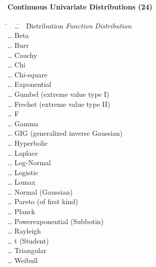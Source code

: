 \paragraph{Continuous Univariate Distributions (24)}

\begin{tabbing}
	\hspace*{1em}
	\= ~~\=\ldots~~\=  Distribution \kill
	\> \emph{Function} \> \> \emph{Distribution} \\[1ex]
	\> 	\> \ldots \> Beta \\
	\> 	\> \ldots \> Burr \\
	\> 	\> \ldots \> Cauchy \\
	\> 	\> \ldots \> Chi \\
	\> 	\> \ldots \> Chi-square \\
	\> 	\> \ldots \> Exponential \\
	\> 	\> \ldots \> Gumbel (extreme value type I) \\
	\> 	\> \ldots \> Frechet (extreme value type II) \\
	\> 	\> \ldots \> F \\
	\> 	\> \ldots \> Gamma \\
	\> 	\> \ldots \> GIG (generalized inverse Gaussian) \\
	\> 	\> \ldots \> Hyperbolic \\
	\> 	\> \ldots \> Laplace \\
	\> 	\> \ldots \> Log-Normal \\
	\> 	\> \ldots \> Logistic \\
	\> 	\> \ldots \> Lomax \\
	\> 	\> \ldots \> Normal (Gaussian) \\
	\> 	\> \ldots \> Pareto (of first kind) \\
	\> 	\> \ldots \> Planck \\
	\> 	\> \ldots \> Powerexponential (Subbotin) \\
	\> 	\> \ldots \> Rayleigh \\
	\> 	\> \ldots \> t (Student) \\
	\> 	\> \ldots \> Triangular \\
	\> 	\> \ldots \> Weibull \\
\end{tabbing}


